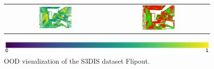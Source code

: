 \begin{figure}[h!]
\begin{tabular}{cc}
            \includegraphics[width=0.33\textwidth, height=0.18\textheight]{images/ood_imgs/fout_s3dis/ofc_42_fout_prob.pdf}& 
            \includegraphics[width=0.33\textwidth, height=0.18\textheight]{images/ood_imgs/fout_s3dis/fout_prob_1.pdf}\\
        \end{tabular}
        \includegraphics[scale=0.45]{images/prob_legend.pdf}
        \caption{OOD visualization of the S3DIS dataset Flipout.}
        \label{fig:fout_s3dis_oodmap_prob}
    \end{figure}


